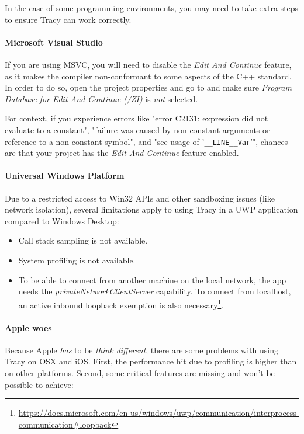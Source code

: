 \documentclass[hidelinks,titlepage,a4paper,twoside]{article}
\begin{document}
In the case of some programming environments, you may need to take extra steps to ensure Tracy can work correctly.

\paragraph{Microsoft Visual Studio}

If you are using MSVC, you will need to disable the \emph{Edit And Continue} feature, as it makes the compiler non-conformant to some aspects of the C++ standard. In order to do so, open the project properties and go to  and make sure \emph{Program Database for Edit And Continue (/ZI)} is \emph{not} selected.

For context, if you experience errors like "error C2131: expression did not evaluate to a constant", "failure was caused by non-constant arguments or reference to a non-constant symbol", and "see usage of '\texttt{\_\_LINE\_\_Var}'", chances are that your project has the \emph{Edit And Continue} feature enabled.

\paragraph{Universal Windows Platform}

Due to a restricted access to Win32 APIs and other sandboxing issues (like network isolation), several limitations apply to using Tracy in a UWP application compared to Windows Desktop:

\begin{itemize}
\item Call stack sampling is not available.
\item System profiling is not available.
\item To be able to connect from another machine on the local network, the app needs the \emph{privateNetworkClientServer} capability. To connect from localhost, an active inbound loopback exemption is also necessary\footnote{\url{https://docs.microsoft.com/en-us/windows/uwp/communication/interprocess-communication\#loopback}}.
\end{itemize}

\paragraph{Apple woes}

Because Apple \emph{has} to be \emph{think different}, there are some problems with using Tracy on OSX and iOS. First, the performance hit due to profiling is higher than on other platforms. Second, some critical features are missing and won't be possible to achieve:
\end{document}
